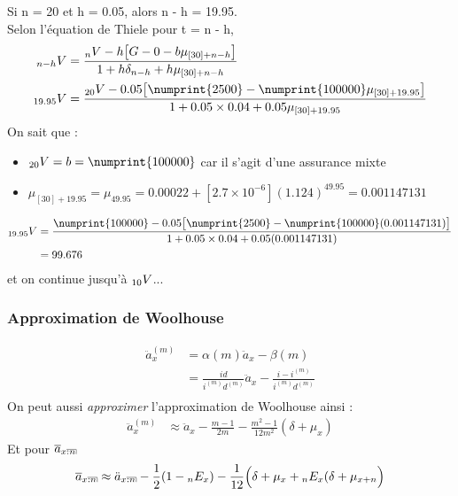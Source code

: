\documentclass[11pt,french]{report}
\makeatletter
\DeclareRobustCommand{\annuity}[1]{%
\def\arraystretch{0}%
\setlength\arraycolsep{.7pt}%
\setlength\arrayrulewidth{.3pt}%
\begin{array}[b]{@{}c|}\hline
\\[\arraycolsep]%
\scriptstyle #1%
\end{array}%
}
\newcommand{\indiceGauche}[2]{{\vphantom{#2}}_{#1}#2}
\makeatother
\begin{document}
Si n = 20 et h = 0.05, alors n - h = 19.95.\\
Selon l'équation de Thiele  pour t = n - h,
\begin{align*}
\indiceGauche{n-h}{V} &=\frac{\indiceGauche{n}{V} - h\big[ G - 0 -b \mu_{[30]+n-h}\big]}{1 + h\delta_{n-h} + h\mu_{[30]+n-h}}\\
\indiceGauche{19.95}{V} &=\frac{\indiceGauche{20}{V} - 0.05\big[ \numprint{2500} - \numprint{100000} \mu_{[30]+19.95}\big]}{1 + 0.05\times 0.04 + 0.05\mu_{[30]+19.95}}
\end{align*}
On sait que :
\begin{itemize}
\item $\indiceGauche{20}{V} = b = \numprint{100000}$ car il s'agit d'une assurance mixte
\item $\mu_{[30]+19.95} = \mu_{49.95}= 0.00022 + [2.7 \times 10^{-6}](1.124)^{49.95} = 0.001147131$
\end{itemize}
\begin{align*}
\indiceGauche{19.95}{V} &=\frac{\numprint{100000} - 0.05\big[ \numprint{2500} - \numprint{100000} (0.001147131)\big]}{1 + 0.05\times 0.04 + 0.05(0.001147131)}\\
&=99.676
\end{align*}
et on continue jusqu'à $\indiceGauche{10}{V}$...
\subsubsection*{Approximation de Woolhouse}
\label{Appr:woolhouse}
\begin{align*}
\ddot{a}_{x}^{(m)} &= \alpha(m)\ddot{a}_{x} - \beta(m) \\
&= \frac{id}{i^{(m)}d^{(m)}} \ddot{a}_{x} - \frac{i - i^{(m)}}{i^{(m)}d^{(m)}}\\
\end{align*}
On peut aussi \textit{approximer} l'approximation de Woolhouse ainsi :
\begin{align*}
\ddot{a}_{x}^{(m)} &\approx \ddot{a}_{x} - \frac{m -1}{2m} -  \frac{m^2 - 1}{12m^2}(\delta + \mu_x)
\end{align*}
Et pour $\overline{a}_{x\annuity{:n}}$
\begin{align*}
\overline{a}_{x\annuity{:n}} \approx \ddot{a}_{x\annuity{:n}} - \frac{1}{2} (1 - \indiceGauche{n}{E}_{x}) - \frac{1}{12}\Big( \delta + \mu _{x} + \indiceGauche{n}{E}_{x}(\delta + \mu_{x+n} \Big)
\end{align*}
\end{document}

